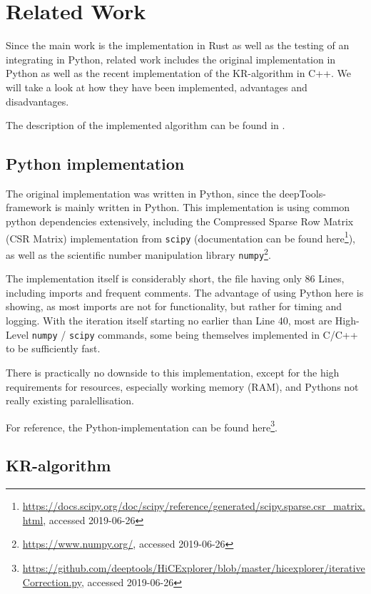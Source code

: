 \chapter{Related Work}\label{chap:relatedwork}

Since the main work is the implementation in Rust as well as the testing of an
integrating in Python, related work includes the original implementation in
Python as well as the recent implementation of the KR-algorithm in C++.
We will take a look at how they have been implemented, advantages and
disadvantages.

 The description of the implemented algorithm can be found in .


\section{Python implementation}\label{sec:python}

The original implementation was written in Python, since the
deepTools-framework is mainly written in Python. This implementation is using
common python dependencies extensively, including the Compressed Sparse Row
Matrix (CSR Matrix) implementation from \verb|scipy| (documentation can be
found
here\footnote{\url{https://docs.scipy.org/doc/scipy/reference/generated/scipy.sparse.csr_matrix.html},
accessed 2019-06-26}), as well as the scientific number manipulation library
\verb|numpy|\footnote{\url{https://www.numpy.org/}, accessed 2019-06-26}.

The implementation itself is considerably short, the file having only 86 Lines,
including imports and frequent comments. The advantage of using Python here is
showing, as most imports are not for functionality, but rather for timing and
logging. With the iteration itself starting no earlier than Line 40, most
are High-Level \verb|numpy| / \verb|scipy| commands, some being themselves
implemented in C/C++ to be sufficiently fast.

There is practically no downside to this implementation, except for the high
requirements for resources, especially working memory (RAM), and Pythons not really existing paralellisation.

For reference, the Python-implementation can be found
here\footnote{\url{https://github.com/deeptools/HiCExplorer/blob/master/hicexplorer/iterativeCorrection.py},
accessed 2019-06-26}.




\section{KR-algorithm}\label{sec:KR}

